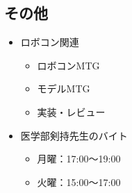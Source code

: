 \documentclass[uplatex, onecolumn, 10pt]{jsarticle}
\begin{document}
\subsection*{その他}
\begin{itemize}
    \item ロボコン関連
	\begin{itemize}
		\item ロボコンMTG
		\item モデルMTG
		\item 実装・レビュー
	\end{itemize}
    \item 医学部剣持先生のバイト
    \begin{itemize}
		\item 月曜：17:00～19:00
		\item 火曜：15:00～17:00
	\end{itemize}
\end{itemize}
\end{document}
